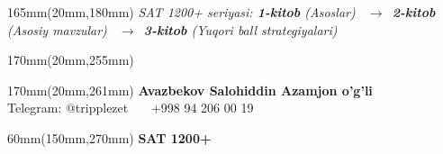 \documentclass[a4paper]{article}
\begin{document}
\begin{textblock*}{165mm}(20mm,180mm)
{\fontsize{10}{14}\selectfont\color{black!55}\itshape
SAT 1200+ seriyasi: \textbf{1-kitob} (Asoslar) \ $\rightarrow$\ \textbf{2-kitob} (Asosiy mavzular) \ $\rightarrow$\ \textbf{3-kitob} (Yuqori ball strategiyalari)
}
\end{textblock*}

\begin{textblock*}{170mm}(20mm,255mm)
\end{textblock*}

\begin{textblock*}{170mm}(20mm,261mm)
{\sffamily\fontsize{10.5}{15}\selectfont\color{ink}
\textbf{Avazbekov Salohiddin Azamjon o'g'li} \\[1mm]
{\fontsize{9.5}{14}\selectfont\color{black!55} Telegram: @tripplezet \ \textperiodcentered\ \ +998 94 206 00 19}
}
\end{textblock*}

\begin{textblock*}{60mm}(150mm,270mm)
{\sffamily\bfseries\fontsize{15}{18}\selectfont\color{accent} SAT 1200+}
\end{textblock*}
\end{document}
